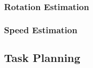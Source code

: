 \subsubsection{Rotation Estimation}

\subsubsection{Speed Estimation}


\subsection{Task Planning}

%
%

%
%



